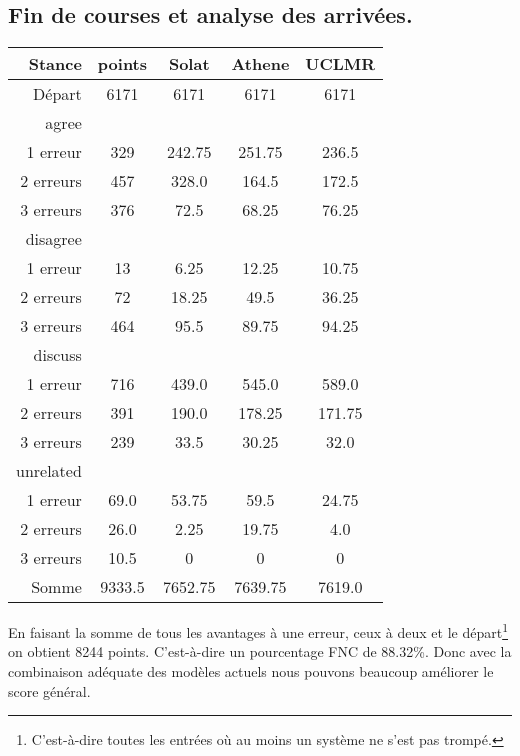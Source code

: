 \documentclass[onecolumn, 12pt]{article}
\begin{document}
 \subsection{Fin de courses et analyse des arrivées.}
 
 \begin{center}
  \begin{tabular}{ r | c || c c c }
   Stance    & points & Solat   & Athene  & UCLMR  \\ \hline
   Départ   & 6171   & 6171    & 6171    & 6171   \\ \hline
   agree     &        &         &         &        \\
   1 erreur  & 329    & 242.75  & 251.75  & 236.5  \\
   2 erreurs & 457    & 328.0   & 164.5   & 172.5  \\
   3 erreurs & 376    & 72.5    & 68.25   & 76.25  \\\hline
   disagree  &        &         &         &        \\
   1 erreur  & 13     & 6.25    & 12.25   & 10.75  \\
   2 erreurs & 72     & 18.25   & 49.5    & 36.25  \\
   3 erreurs & 464    & 95.5    & 89.75   & 94.25  \\\hline
   discuss   &        &         &         &        \\
   1 erreur  & 716    & 439.0   & 545.0   & 589.0  \\
   2 erreurs & 391    & 190.0   & 178.25  & 171.75 \\
   3 erreurs & 239    & 33.5    & 30.25   & 32.0   \\\hline
   unrelated &        &         &         &        \\
   1 erreur  & 69.0   & 53.75   & 59.5    & 24.75  \\
   2 erreurs & 26.0   & 2.25    & 19.75   & 4.0    \\
   3 erreurs & 10.5   & 0       & 0       & 0      \\   \hline
   Somme     & 9333.5 & 7652.75 & 7639.75 & 7619.0 \\
  \end{tabular}
 \end{center}
 
 En faisant la somme de tous les avantages à une erreur, ceux à deux et le départ\footnote{C'est-à-dire toutes les entrées où au moins un système ne s'est pas trompé.} on obtient 8244 points.
 C'est-à-dire un pourcentage FNC de 88.32\%.
 Donc avec la combinaison adéquate des modèles actuels nous pouvons beaucoup améliorer le score général.
 
\end{document}
